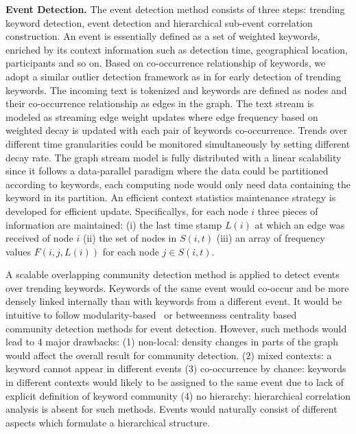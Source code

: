 

\noindent\textbf{Event Detection.}
\label{detection}
The event detection method consists of three steps: trending keyword detection, event detection and hierarchical sub-event correlation construction.
An event is essentially defined as a set of weighted keywords, enriched by its context information such as detection time, geographical location, participants and so on.
Based on co-occurrence relationship of keywords, we adopt a similar outlier detection framework as in \cite{yu2013anomalous} for early detection of trending keywords.
The incoming text is tokenized and keywords are defined as nodes and their co-occurrence relationship as edges in the graph.
The text stream is modeled as streaming edge weight updates where edge frequency based on weighted decay is updated with each pair of keywords co-occurrence.
Trends over different time granularities could be monitored simultaneously by setting different decay rate.
The graph stream model is fully distributed with a linear scalability since it follows a data-parallel paradigm where the data could be partitioned according to keywords, \ie each computing node would only need data containing the keyword in its partition. 
An efficient context statistics maintenance strategy is developed for efficient update.
Specificallys, for each node $i$ three pieces of information are maintained:
(i) the last time stamp $L(i)$ at which an edge was received of node $i$
(ii) the set of nodes in $S(i,t)$
(iii) an array of frequency values $F(i, j, L(i))$ for each node $j\in S(i,t)$.

A scalable overlapping community detection method is applied to detect events over trending keywords.
Keywords of the same event would co-occur and be more densely linked internally than with keywords from a different event.
It would be intuitive to follow modularity-based~\cite{weng2011event} or betweenness centrality based~\cite{sayyadi2013toit}
community detection methods for event detection.
However, such methods would lead to 4 major drawbacks:
(1) non-local: density changes in parts of the graph would affect the overall result for community detection.
(2) mixed contexts: a keyword cannot appear in different events
(3) co-occurrence by chance: keywords in different contexts would likely to be assigned to the same event due to lack of explicit definition of keyword community
(4) no hierarchy: hierarchical correlation analysis is absent for such methods.
Events would naturally consist of different aspects which formulate a hierarchical structure.

